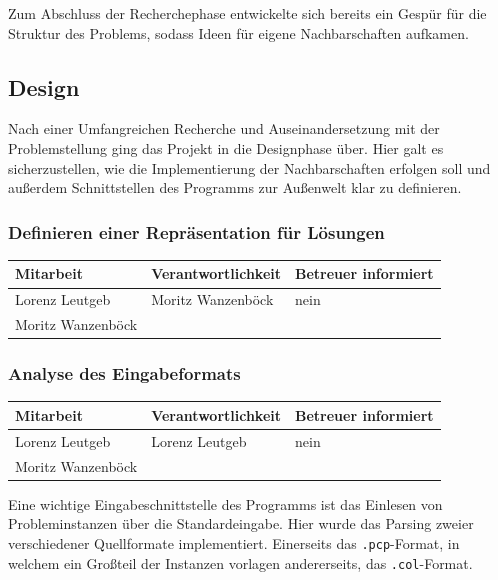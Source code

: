Zum Abschluss der Recherchephase entwickelte sich bereits ein Gespür für die Struktur des Problems, sodass Ideen für eigene Nachbarschaften aufkamen. %

\subsection{Design}
Nach einer Umfangreichen Recherche und Auseinandersetzung mit der Problemstellung ging das Projekt in die Designphase über. Hier galt es sicherzustellen, wie die Implementierung der Nachbarschaften erfolgen soll und außerdem Schnittstellen des Programms zur Außenwelt klar zu definieren.

\subsubsection{ Definieren einer Repräsentation für Lösungen}

\begin{center}
\begin{tabular}{lll}
	Mitarbeit & Verantwortlichkeit & Betreuer informiert \\
	\hline
	Lorenz Leutgeb & Moritz Wanzenböck & nein \\
	Moritz Wanzenböck & & \\
\end{tabular}
\end{center}

\subsubsection{ Analyse des Eingabeformats}

\begin{center}
\begin{tabular}{lll}
	Mitarbeit & Verantwortlichkeit & Betreuer informiert \\
	\hline
	Lorenz Leutgeb & Lorenz Leutgeb & nein \\
	Moritz Wanzenböck & & \\
\end{tabular}
\end{center}

Eine wichtige Eingabeschnittstelle des Programms ist das Einlesen von Probleminstanzen über die Standardeingabe. Hier wurde das Parsing zweier verschiedener Quellformate implementiert. Einerseits das \texttt{.pcp}-Format, in welchem ein Großteil der Instanzen vorlagen andererseits, das \texttt{.col}-Format.

